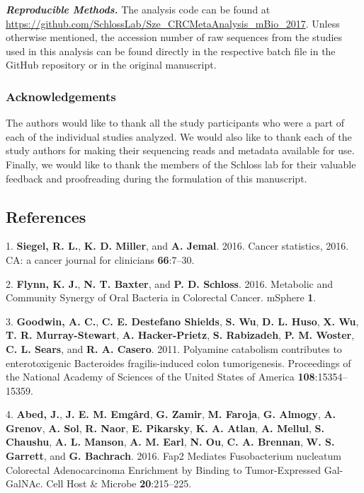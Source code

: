 \documentclass[12pt,]{article}
\begin{document}
\textbf{\emph{Reproducible Methods.}} The analysis code can be found at
\url{https://github.com/SchlossLab/Sze_CRCMetaAnalysis_mBio_2017}.
Unless otherwise mentioned, the accession number of raw sequences from
the studies used in this analysis can be found directly in the
respective batch file in the GitHub repository or in the original
manuscript.

\newpage

\subsubsection{Acknowledgements}\label{acknowledgements}

The authors would like to thank all the study participants who were a
part of each of the individual studies analyzed. We would also like to
thank each of the study authors for making their sequencing reads and
metadata available for use. Finally, we would like to thank the members
of the Schloss lab for their valuable feedback and proofreading during
the formulation of this manuscript.

\newpage

\subsection{References}\label{references}

\hypertarget{refs}{}
\hypertarget{ref-siegel_cancer_2016}{}
1. \textbf{Siegel, R. L.}, \textbf{K. D. Miller}, and \textbf{A. Jemal}.
2016. Cancer statistics, 2016. CA: a cancer journal for clinicians
\textbf{66}:7--30.

\hypertarget{ref-flynn_metabolic_2016}{}
2. \textbf{Flynn, K. J.}, \textbf{N. T. Baxter}, and \textbf{P. D.
Schloss}. 2016. Metabolic and Community Synergy of Oral Bacteria in
Colorectal Cancer. mSphere \textbf{1}.

\hypertarget{ref-goodwin_polyamine_2011}{}
3. \textbf{Goodwin, A. C.}, \textbf{C. E. Destefano Shields}, \textbf{S.
Wu}, \textbf{D. L. Huso}, \textbf{X. Wu}, \textbf{T. R. Murray-Stewart},
\textbf{A. Hacker-Prietz}, \textbf{S. Rabizadeh}, \textbf{P. M. Woster},
\textbf{C. L. Sears}, and \textbf{R. A. Casero}. 2011. Polyamine
catabolism contributes to enterotoxigenic Bacteroides fragilis-induced
colon tumorigenesis. Proceedings of the National Academy of Sciences of
the United States of America \textbf{108}:15354--15359.

\hypertarget{ref-abed_fap2_2016}{}
4. \textbf{Abed, J.}, \textbf{J. E. M. Emgård}, \textbf{G. Zamir},
\textbf{M. Faroja}, \textbf{G. Almogy}, \textbf{A. Grenov}, \textbf{A.
Sol}, \textbf{R. Naor}, \textbf{E. Pikarsky}, \textbf{K. A. Atlan},
\textbf{A. Mellul}, \textbf{S. Chaushu}, \textbf{A. L. Manson},
\textbf{A. M. Earl}, \textbf{N. Ou}, \textbf{C. A. Brennan}, \textbf{W.
S. Garrett}, and \textbf{G. Bachrach}. 2016. Fap2 Mediates Fusobacterium
nucleatum Colorectal Adenocarcinoma Enrichment by Binding to
Tumor-Expressed Gal-GalNAc. Cell Host \& Microbe \textbf{20}:215--225.
\end{document}
